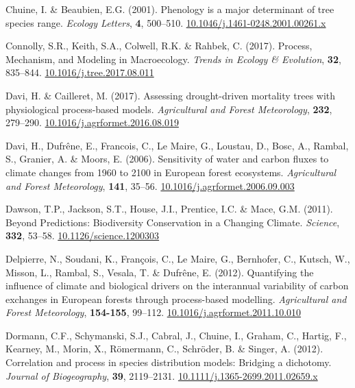 \documentclass[11pt,]{article}
\newlength{\cslhangindent}
\newenvironment{CSLReferences}[2] %
 {%
  \setlength{\parindent}{0pt}
  \ifodd #1 \everypar{\setlength{\hangindent}{\cslhangindent}}\ignorespaces\fi
  \ifnum #2 > 0
  \setlength{\parskip}{#2\baselineskip}
  \fi
 }%
 {}
\begin{document}
\begin{CSLReferences}{1}{0}
\leavevmode{}%
Chuine, I. \& Beaubien, E.G. (2001). Phenology is a major determinant of
tree species range. \emph{Ecology Letters}, \textbf{4}, 500--510.
\href{https://doi.org/10.1046/j.1461-0248.2001.00261.x}{10.1046/j.1461-0248.2001.00261.x}

\leavevmode{}%
Connolly, S.R., Keith, S.A., Colwell, R.K. \& Rahbek, C. (2017).
Process, {Mechanism}, and {Modeling} in {Macroecology}. \emph{Trends in
Ecology \& Evolution}, \textbf{32}, 835--844.
\href{https://doi.org/10.1016/j.tree.2017.08.011}{10.1016/j.tree.2017.08.011}

\leavevmode{}%
Davi, H. \& Cailleret, M. (2017). Assessing drought-driven mortality
trees with physiological process-based models. \emph{Agricultural and
Forest Meteorology}, \textbf{232}, 279--290.
\href{https://doi.org/10.1016/j.agrformet.2016.08.019}{10.1016/j.agrformet.2016.08.019}

\leavevmode{}%
Davi, H., Dufrêne, E., Francois, C., Le Maire, G., Loustau, D., Bosc,
A., Rambal, S., Granier, A. \& Moors, E. (2006). Sensitivity of water
and carbon fluxes to climate changes from 1960 to 2100 in {European}
forest ecosystems. \emph{Agricultural and Forest Meteorology},
\textbf{141}, 35--56.
\href{https://doi.org/10.1016/j.agrformet.2006.09.003}{10.1016/j.agrformet.2006.09.003}

\leavevmode{}%
Dawson, T.P., Jackson, S.T., House, J.I., Prentice, I.C. \& Mace, G.M.
(2011). Beyond {Predictions}: {Biodiversity} {Conservation} in a
{Changing} {Climate}. \emph{Science}, \textbf{332}, 53--58.
\href{https://doi.org/10.1126/science.1200303}{10.1126/science.1200303}

\leavevmode{}%
Delpierre, N., Soudani, K., François, C., Le Maire, G., Bernhofer, C.,
Kutsch, W., Misson, L., Rambal, S., Vesala, T. \& Dufrêne, E. (2012).
Quantifying the influence of climate and biological drivers on the
interannual variability of carbon exchanges in {European} forests
through process-based modelling. \emph{Agricultural and Forest
Meteorology}, \textbf{154-155}, 99--112.
\href{https://doi.org/10.1016/j.agrformet.2011.10.010}{10.1016/j.agrformet.2011.10.010}

\leavevmode{}%
Dormann, C.F., Schymanski, S.J., Cabral, J., Chuine, I., Graham, C.,
Hartig, F., Kearney, M., Morin, X., Römermann, C., Schröder, B. \&
Singer, A. (2012). Correlation and process in species distribution
models: Bridging a dichotomy. \emph{Journal of Biogeography},
\textbf{39}, 2119--2131.
\href{https://doi.org/10.1111/j.1365-2699.2011.02659.x}{10.1111/j.1365-2699.2011.02659.x}


\end{CSLReferences}
\end{document}
